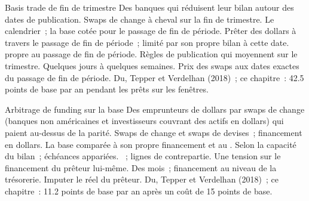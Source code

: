 \begin{strategyfile}{Basis trade de fin de trimestre}\label{strat:s2:cross-currency-basis-and-fx-carry:qe}
 Des banques qui réduisent leur bilan autour des dates de publication.
 Swaps de change à cheval sur la fin de trimestre.
 Le calendrier~; la base cotée pour le passage de fin de période.
 Prêter des dollars à travers le passage de fin de période~; limité par son propre bilan à cette date.
  propre au passage de fin de période.
 Règles de publication qui moyennent sur le trimestre.
 Quelques jours à quelques semaines.
 Prix des swaps aux dates exactes du passage de fin de période.
 Du, Tepper et Verdelhan (2018)~; ce chapitre~: 42.5 points de base par an pendant les prêts sur les fenêtres.
\end{strategyfile}

\begin{strategyfile}{Arbitrage de funding sur la base}\label{strat:s2:cross-currency-basis-and-fx-carry:funding}
 Des emprunteurs de dollars par swaps de change (banques non américaines et investisseurs couvrant des actifs en dollars) qui paient au-dessus de la parité.
 Swaps de change et swaps de devises~; financement en dollars.
 La base comparée à son propre financement et au .
 Selon la capacité du bilan~; échéances appariées.
 ~; lignes de contrepartie.
 Une tension sur le financement du prêteur lui-même.
 Des mois~; financement au niveau de la trésorerie.
 Imputer le  réel du prêteur.
 Du, Tepper et Verdelhan (2018)~; ce chapitre~: 11.2 points de base par an après un coût de 15 points de base.
\end{strategyfile}

